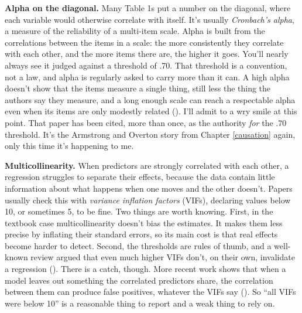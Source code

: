\documentclass[
]{book}
\begin{document}
\textbf{Alpha on the diagonal.} Many Table 1s put a number on the diagonal, where each variable would otherwise correlate with itself. It's usually \emph{Cronbach's alpha}, a measure of the reliability of a multi-item scale. Alpha is built from the correlations between the items in a scale: the more consistently they correlate with each other, and the more items there are, the higher it goes. You'll nearly always see it judged against a threshold of .70. That threshold is a convention, not a law, and alpha is regularly asked to carry more than it can. A high alpha doesn't show that the items measure a single thing, still less the thing the authors say they measure, and a long enough scale can reach a respectable alpha even when its items are only modestly related (). I'll admit to a wry smile at this point. That paper has been cited, more than once, as the authority \emph{for} the .70 threshold. It's the Armstrong and Overton story from Chapter \ref{causation} again, only this time it's happening to me.

\textbf{Multicollinearity.} When predictors are strongly correlated with each other, a regression struggles to separate their effects, because the data contain little information about what happens when one moves and the other doesn't. Papers usually check this with \emph{variance inflation factors} (VIFs), declaring values below 10, or sometimes 5, to be fine. Two things are worth knowing. First, in the textbook case multicollinearity doesn't bias the estimates. It makes them less precise by inflating their standard errors, so its main cost is that real effects become harder to detect. Second, the thresholds are rules of thumb, and a well-known review argued that even much higher VIFs don't, on their own, invalidate a regression (). There is a catch, though. More recent work shows that when a model leaves out something the correlated predictors share, the correlation between them can produce false positives, whatever the VIFs say (). So ``all VIFs were below 10'' is a reasonable thing to report and a weak thing to rely on.
\end{document}
